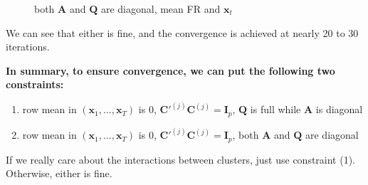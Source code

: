\documentclass[]{article}
\begin{document}
\begin{figure}[h!]
	\caption{both \(\mathbf{A}\) and \(\mathbf{Q}\) are diagonal, mean FR and $\mathbf{x}_t$}
	\label{FR and X, diag AQ}
\end{figure}

We can see that either is fine, and the convergence is achieved at nearly 20 to 30 iterations.

\textbf{In summary, to ensure convergence, we can put the following two constraints:}
\begin{enumerate}
	\def\labelenumi{(\arabic{enumi})}
	\item
	row mean in \((\mathbf{x}_{1},\ldots,\mathbf{x}_{T})\) is 0,
	\(\mathbf{C}'^{(j)}\mathbf{C}^{(j)} = \mathbf{I}_{p}\), \(\mathbf{Q}\) is full while \(\mathbf{A}\) is
	diagonal
	\item
	row mean in \((\mathbf{x}_{1},\ldots,\mathbf{x}_{T})\) is 0,
	\(\mathbf{C}'^{(j)}\mathbf{C}^{(j)} = \mathbf{I}_{p}\), both \(\mathbf{A}\) and \(\mathbf{Q}\) are diagonal
\end{enumerate}

If we really care about the interactions between clusters, just use constraint (1). Otherwise, either is fine.
\end{document}

